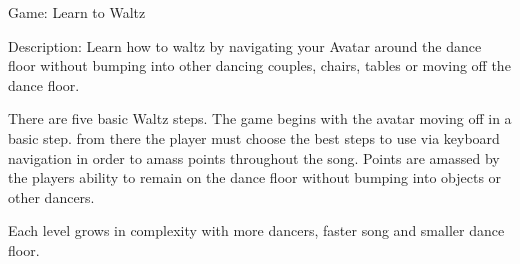 Game: Learn to Waltz

Description:
Learn how to waltz by navigating your Avatar around the dance floor without bumping into other dancing couples, chairs, tables or moving off the dance floor.

There are five basic Waltz steps. The game begins with the avatar moving off in a basic step. from there the player must choose the best steps to use via keyboard navigation in order to amass points throughout the song. Points are amassed by the players ability to remain on the dance floor without bumping into objects or other dancers.

Each level grows in complexity with more dancers, faster song and smaller dance floor.